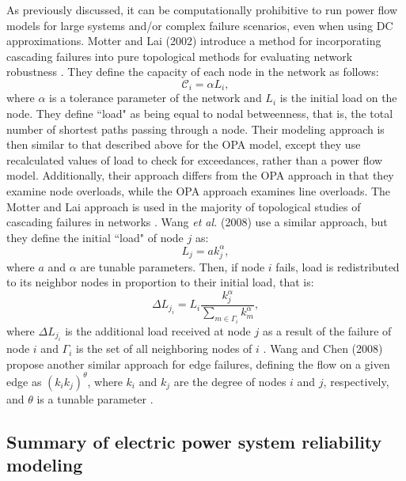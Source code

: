 As previously discussed, it can be computationally prohibitive to run power flow models for large systems and/or complex failure scenarios, even when using DC approximations. Motter and Lai (2002) introduce a method for incorporating cascading failures into pure topological methods for evaluating network robustness \cite{Motter2002a}. They define the capacity of each node in the network as follows:
%
\begin{equation}
\mathcal{C}_{i}=\alpha L_{i},
\end{equation}
%
where $\alpha$ is a tolerance parameter of the network and $L_{i}$ is the initial load on the node. They define ``load" as being equal to nodal betweenness, that is, the total number of shortest paths passing through a node. Their modeling approach is then similar to that described above for the OPA model, except they use recalculated values of load to check for exceedances, rather than a power flow model. Additionally, their approach differs from the OPA approach in that they examine node overloads, while the OPA approach examines line overloads. The Motter and Lai approach is used in the majority of topological studies of cascading failures in networks \cite{Crucitti2004a, Crucitti2004b, Kinney2005, Bao2008, Motter2008, Simonsen2008, Sun2008, Duenas-Osorio2009}.  Wang \emph{et al.} (2008) use a similar approach, but they define the initial ``load" of node $j$ as:
%
\begin{equation}
L_{j}=ak_{j}^{\alpha},
\end{equation}
%
where $a$ and $\alpha$ are tunable parameters. Then, if node $i$ fails, load is redistributed to its neighbor nodes in proportion to their initial load, that is:
%
\begin{equation}
\Delta L_{j_i}=L_i \frac{k_j^{\alpha}}{\sum \limits_{m \in \Gamma_i} k_m^{\alpha}},
\end{equation}
%
where $\Delta L_{j_i}$ is the additional load received at node $j$ as a result of the failure of node $i$ and $\Gamma_i$ is the set of all neighboring nodes of $i$ \cite{Wang2008d}. Wang and Chen (2008) propose another similar approach for edge failures, defining the flow on a given edge as $(k_ik_j)^\theta$, where $k_i$ and $k_j$ are the degree of nodes $i$ and $j$, respectively, and $\theta$ is a tunable parameter \cite{Wang2008b}.


\subsection{Summary of electric power system reliability modeling}
\label{sec:ch1:powerreliability:summary}

